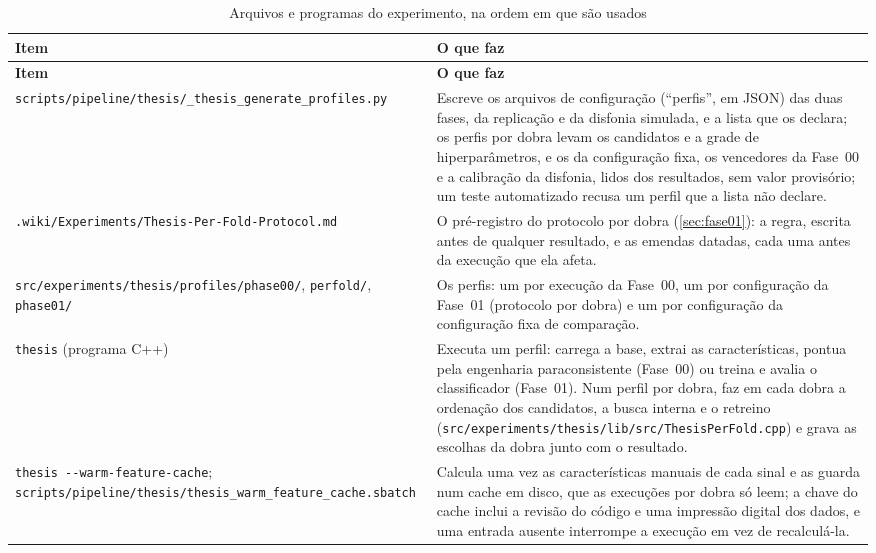 \begin{apendicesenv}
		{\small
		\tableZebraStripe
		\begin{longtable}{@{}Y{0.30\textwidth}Y{0.64\textwidth}@{}}
			\caption[Arquivos e programas do experimento]{Arquivos e programas do experimento, na ordem em que são usados} \label{tab:reprodutibilidade} \\
			\tableHeaderRow \textbf{Item} & \textbf{O que faz} \\
			\endfirsthead
			\tableHeaderRow \textbf{Item} & \textbf{O que faz} \\
			\endhead
			\bottomrule
			\endlastfoot
			\raggedright\texttt{scripts/\allowbreak pipeline/\allowbreak thesis/\_thesis\_\allowbreak generate\_\allowbreak profiles.py} & Escreve os arquivos de configuração (``perfis'', em \ac{JSON}) das duas fases, da replicação e da disfonia simulada, e a lista que os declara; os perfis por dobra levam os candidatos e a grade de hiperparâmetros, e os da configuração fixa, os vencedores da Fase~00 e a calibração da disfonia, lidos dos resultados, sem valor provisório; um teste automatizado recusa um perfil que a lista não declare. \\
			\raggedright\texttt{.wiki/\allowbreak Experiments/\allowbreak Thesis-\allowbreak Per-\allowbreak Fold-\allowbreak Protocol.md} & O pré-registro do protocolo por dobra (\autoref{sec:fase01}): a regra, escrita antes de qualquer resultado, e as emendas datadas, cada uma antes da execução que ela afeta. \\
			\raggedright\texttt{src/\allowbreak experiments/\allowbreak thesis/\allowbreak profiles/\allowbreak phase00/}, \texttt{perfold/}, \texttt{phase01/} & Os perfis: um por execução da Fase~00, um por configuração da Fase~01 (protocolo por dobra) e um por configuração da configuração fixa de comparação. \\
			\raggedright\texttt{thesis} (programa C++) & Executa um perfil: carrega a base, extrai as características, pontua pela engenharia paraconsistente (Fase~00) ou treina e avalia o classificador (Fase~01). Num perfil por dobra, faz em cada dobra a ordenação dos candidatos, a busca interna e o retreino (\texttt{src/\allowbreak experiments/\allowbreak thesis/\allowbreak lib/\allowbreak src/\allowbreak ThesisPerFold.cpp}) e grava as escolhas da dobra junto com o resultado. \\
			\raggedright\texttt{thesis -{}-warm-feature-cache}; \texttt{scripts/\allowbreak pipeline/\allowbreak thesis/\allowbreak thesis\_warm\_\allowbreak feature\_\allowbreak cache.sbatch} & Calcula uma vez as características manuais de cada sinal e as guarda num cache em disco, que as execuções por dobra só leem; a chave do cache inclui a revisão do código e uma impressão digital dos dados, e uma entrada ausente interrompe a execução em vez de recalculá-la. \\

\end{longtable}}
\end{apendicesenv}
